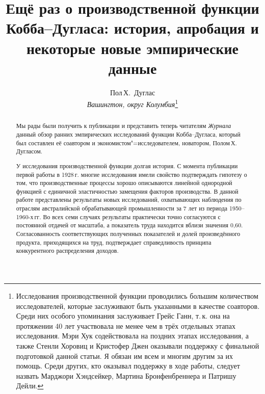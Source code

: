 \documentclass{article}
\title{Ещё раз о производственной функции Кобба--Дугласа: история, апробация и некоторые новые эмпирические данные}
\author{Пол\,Х.~Дуглас\\
\emph{Вашингтон, округ Колумбия}\thanks{Исследования производственной функции проводились большим количеством исследователей, которые заслуживают быть указанными в качестве соавторов. Среди них особого упоминания заслуживает Грейс Ганн, т.\,к. она на протяжении 40 лет участвовала не менее чем в трёх отдельных этапах исследования. Мэри Хук содействовала на поздних этапах исследования, а также Стенли Хоровиц и Кристофер Джен оказывали поддержку с финальной подготовкой данной статьи. Я обязан им всем и многим другим за их помощь. Среди других, кто оказывал поддержку в ходе работы, следует назвать Марджори Хэндсейкер, Мартина Бронфенбреннера и Патришу Дейли.}
}
\newenvironment{poliabstract}[1]
  {\renewcommand{\abstractname}{#1}\begin{abstract}}
  {\end{abstract}}
\begin{document}
\renewcommand{\abstractname}{От редактора}
\maketitle

\begin{poliabstract}{От редактора} 
Мы рады были получить к публикации и представить теперь читателям \emph{Журнала} данный обзор ранних эмпирических исследований функции Кобба--Дугласа, который был составлен её соавтором и экономистом"=исследователем, новатором, Полом\,Х.\,Дугласом.
\end{poliabstract}

\begin{poliabstract}{Аннотация}
У исследования производственной функции долгая история. С момента публикации первой работы в 1928\,г. многие исследования имели свойство подтверждать гипотезу о том, что производственные процессы хорошо описываются линейной однородной функцией с единичной эластичностью замещения факторов производства. В данной работе представлены результаты новых исследований, охватывающих наблюдения по отраслям австралийской обрабатывающей промышленности за 7 лет из периода 1950--1960-х\,гг. Во всех семи случаях результаты практически точно согласуются с постоянной отдачей от масштаба, а показатель труда находится вблизи значения 0,60. Согласованность соответствующих полученных показателей и долей произведённого продукта, приходящихся на труд, подтверждает справедливость принципа конкурентного распределения доходов.
\end{poliabstract}
\end{document}
